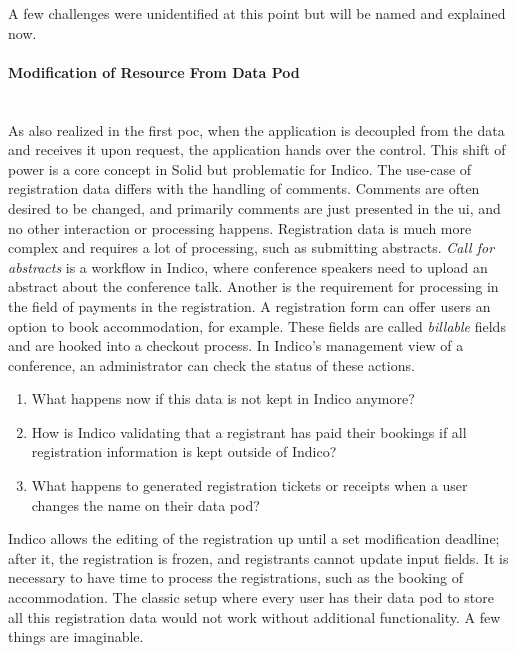 A few challenges were unidentified at this point but will be named and explained now.
\vspace{0.5cm}
\paragraph{Modification of Resource From Data Pod}\mbox{}\\

As also realized in the first \gls{poc}, when the application is decoupled from the data and receives it upon request, the application hands over the control. This shift of power is a core concept in Solid but problematic for Indico. The use-case of registration data differs with the handling of comments. Comments are often desired to be changed, and primarily comments are just presented in the \gls{ui}, and no other interaction or processing happens. Registration data is much more complex and requires a lot of processing, such as submitting abstracts. \textit{Call for abstracts} is a workflow in Indico, where conference speakers need to upload an abstract about the conference talk. Another is the requirement for processing in the field of payments in the registration. A registration form can offer users an option to book accommodation, for example. These fields are called \textit{billable} fields and are hooked into a checkout process. In Indico's management view of a conference, an administrator can check the status of these actions.

\begin{enumerate}
    \item What happens now if this data is not kept in Indico anymore?
    \item How is Indico validating that a registrant has paid their bookings if all registration information is kept outside of Indico?
    \item What happens to generated registration tickets or receipts when a user changes the name on their data pod?
\end{enumerate}

Indico allows the editing of the registration up until a set modification deadline; after it, the registration is frozen, and registrants cannot update input fields. It is necessary to have time to process the registrations, such as the booking of accommodation. The classic setup where every user has their data pod to store all this registration data would not work without additional functionality. A few things are imaginable.

